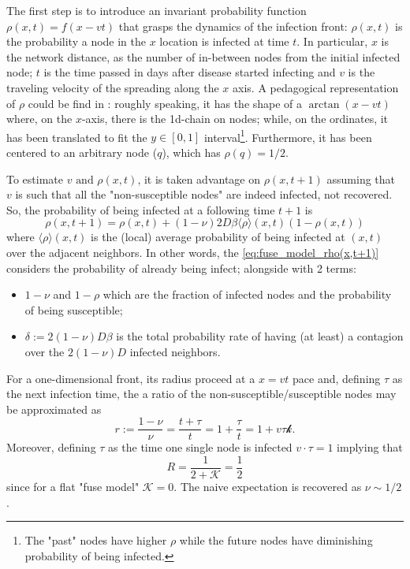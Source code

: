 \documentclass[a4paper,12pt,twoside]{book} %
\theoremstyle{definition}
\begin{document}
The first step is to introduce an invariant probability function $\rho(x,t) = f(x-vt)$ that grasps the dynamics of the infection front: $\rho(x,t)$ is the probability a node in the $x$ location is infected at time $t$.
In particular, $x$ is the network distance, as the number of in-between nodes from the initial infected node; $t$ is the time passed in days after disease started infecting and $v$ is the traveling velocity of the spreading along the $x$ axis.
A pedagogical representation of $\rho$ could be find in \cite{Thurner::Appendix_NetBasedExpl}: roughly speaking, it has the shape of a $\arctan(x-vt)$ where, on the $x$-axis, there is the 1d-chain on  nodes; while, on the ordinates, it has been translated to fit the $y \in [0,1]$ interval\footnote{The "past" nodes have higher $\rho$ while the future nodes have diminishing probability of being infected.}.   Furthermore, it has been centered to an arbitrary node ($q$), which has $\rho(q) = 1/2$.

To estimate $v \text{ and } \rho(x,t)$, it is taken advantage on $\rho(x,t+1)$ assuming that $v$ is such that all the "non-susceptible nodes" are indeed infected, not recovered. So, the probability of being infected at a following time $t+1$ is
\begin{equation}
	\rho(x, t+1) = \rho(x,t)+(1-\nu)2D \beta \langle \rho \rangle(x,t) (1-\rho(x,t))
	\label{eq:fuse_model_rho(x,t+1)}
\end{equation}  
where $\langle \rho \rangle(x,t)$ is the (local) average probability of being infected at $(x,t)$ over the adjacent neighbors.
In other words, the \autoref{eq:fuse_model_rho(x,t+1)} considers the probability of already being infect; alongside with 2 terms:
\begin{itemize}
	\item $1-\nu$ and $1-\rho$ which are the fraction of infected nodes and the probability of being susceptible;
	\item $\delta:= 2(1-\nu)D \beta$ is the total probability rate of having (at least) a contagion over the $2(1-\nu)D$ infected neighbors.
\end{itemize}
For a one-dimensional front, its radius proceed at a $x=vt$ pace and, defining $\tau$ as the next infection time, the a ratio of the non-susceptible/susceptible nodes may be approximated as 
\begin{equation*}
	r:= \frac{1-\nu}{\nu} = \frac{t+\tau}{t} = 1+\frac{\tau}{t} = 1+v \tau \mathcal{k}.
\end{equation*}
Moreover, defining $\tau$ as the time one single node is infected $v \cdot \tau = 1$ implying that 
\[ R = \frac{1}{2+\mathcal{K}} = \frac{1}{2} \]
since for a flat "fuse model" $\mathcal{K} = 0$. 
The naive expectation is recovered as $\nu \sim 1/2$. 
\end{document}
